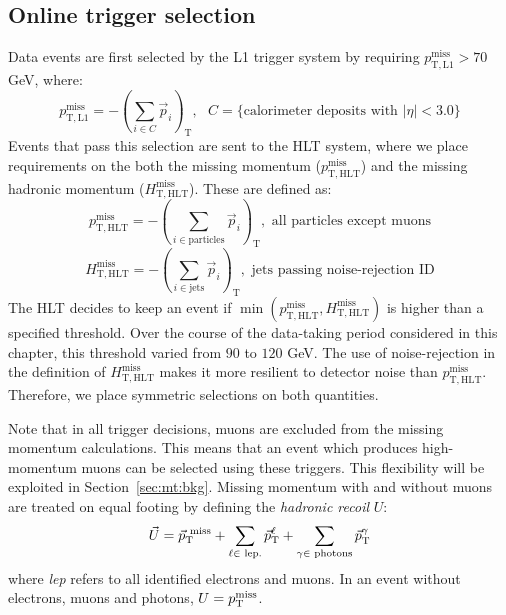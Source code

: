 \subsection{Online trigger selection}
\label{sec:mt:trigger}

Data events are first selected by the L1 trigger system by requiring $p_\mathrm{T,L1}^\mathrm{miss} > 70$ GeV, where:
\begin{equation}
    p_\mathrm{T,L1}^\mathrm{miss} = -\left(\sum_{i\in C} \vec{p}_i \right)_\mathrm{T}, \text{ $C = \{$calorimeter deposits with $|\eta|<3.0\}$}
\end{equation}
Events that pass this selection are sent to the HLT system, where we place requirements on the both the missing momentum ($p_\mathrm{T,HLT}^\mathrm{miss}$) and the missing hadronic momentum ($H_\mathrm{T,HLT}^\mathrm{miss}$).
These are defined as:
\begin{equation}
    p_\mathrm{T,HLT}^\mathrm{miss} = -\left(\sum_{i\in\mathrm{particles}} \vec{p}_i \right)_\mathrm{T}, \text{ all particles except muons}
\end{equation}
\begin{equation}
    H_\mathrm{T,HLT}^\mathrm{miss} = -\left(\sum_{i\in\mathrm{jets}} \vec{p}_i \right)_\mathrm{T}, \text{ jets passing noise-rejection ID}
\end{equation}
The HLT decides to keep an event if $\min(p_\mathrm{T,HLT}^\mathrm{miss}, H_\mathrm{T,HLT}^\mathrm{miss})$ is higher than a specified threshold.
Over the course of the data-taking period considered in this chapter, this threshold varied from $90$ to $120$ GeV.
The use of noise-rejection in the definition of $H_\mathrm{T,HLT}^\mathrm{miss}$ makes it more resilient to detector noise than $p_\mathrm{T,HLT}^\mathrm{miss}$.
Therefore, we place symmetric selections on both quantities.

Note that in all trigger decisions, muons are excluded from the missing momentum calculations.
This means that an event which produces high-momentum muons can be selected using these triggers.
This flexibility will be exploited in Section~\ref{sec:mt:bkg}. 
Missing momentum with and without muons are treated on equal footing by defining the \emph{hadronic recoil} $U$:
\begin{equation}
    \vec{U} = \vec{p}_\mathrm{T}^\mathrm{~miss} + \sum_{\ell\in\text{ lep.}} \vec{p}_\mathrm{T}^\ell + \sum_{\gamma\in\text{ photons}} \vec{p}_\mathrm{T}^\gamma
    \label{eq:mt:u}
\end{equation}
where \emph{lep} refers to all identified electrons and muons.
In an event without electrons, muons and photons, $U = p_\mathrm{T}^\mathrm{miss}$.

